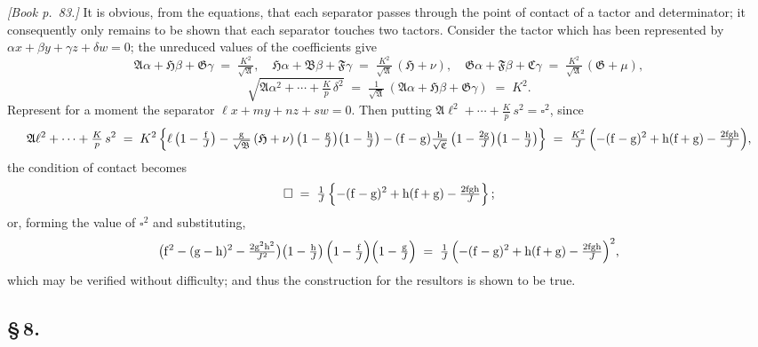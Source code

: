 \documentclass[11pt]{article}
\providecommand{\fA}{\mathfrak{A}}
\providecommand{\fB}{\mathfrak{B}}
\providecommand{\fC}{\mathfrak{C}}
\providecommand{\fF}{\mathfrak{F}}
\providecommand{\fG}{\mathfrak{G}}
\providecommand{\fH}{\mathfrak{H}}
\begin{document}
\noindent\emph{[Book p.~83.]} It is obvious, from the equations, that each separator passes through the point of contact of a tactor and determinator; it consequently only remains to be shown that each separator touches two tactors. Consider the tactor which has been represented by $\alpha x + \beta y + \gamma z + \delta w = 0$; the unreduced values of the coefficients give
\[
\fA\alpha + \fH\beta + \fG\gamma \;=\; \tfrac{K^{2}}{\sqrt{\fA}},\quad \fH\alpha + \fB\beta + \fF\gamma \;=\; \tfrac{K^{2}}{\sqrt{\fA}}\,(\fH + \nu),\quad \fG\alpha + \fF\beta + \fC\gamma \;=\; \tfrac{K^{2}}{\sqrt{\fA}}\,(\fG + \mu),
\]
\[
\sqrt{\fA\alpha^{2} + \cdots + \tfrac{K}{p}\,\delta^{2}} \;=\; \tfrac{1}{\sqrt{\fA}}\,(\fA\alpha + \fH\beta + \fG\gamma) \;=\; K^{2}.
\]
Represent for a moment the separator $\ell x + my + nz + sw = 0$. Then putting $\fA \ell^{2} + \cdots + \tfrac{K}{p}\,s^{2} = \square^{2}$, since
\[
\fA \ell^{2} + \cdots + \tfrac{K}{p}\,s^{2} \;=\; K^{2}\,\Bigl\{\ell\,\bigl(1 - \tfrac{\mathrm{f}}{J}\bigr) - \tfrac{\mathrm{g}}{\sqrt{\fB}}\,(\fH + \nu)\,\bigl(1 - \tfrac{\mathrm{g}}{J}\bigr)\bigl(1 - \tfrac{\mathrm{h}}{J}\bigr) - (\mathrm{f} - \mathrm{g})\tfrac{\mathrm{h}}{\sqrt{\fC}}\,\bigl(1 - \tfrac{2\mathrm{g}}{J}\bigr)\bigl(1 - \tfrac{\mathrm{h}}{J}\bigr)\Bigr\}
\;=\; \tfrac{K^{2}}{J}\,\Bigl(-(\mathrm{f} - \mathrm{g})^{2} + \mathrm{h}(\mathrm{f} + \mathrm{g}) - \tfrac{2\mathrm{f}\mathrm{g}\mathrm{h}}{J}\Bigr),
\]
the condition of contact becomes
\[
\square \;=\; \tfrac{1}{J}\,\Bigl\{-(\mathrm{f} - \mathrm{g})^{2} + \mathrm{h}(\mathrm{f} + \mathrm{g}) - \tfrac{2\mathrm{f}\mathrm{g}\mathrm{h}}{J}\Bigr\}\,;
\]
or, forming the value of $\square^{2}$ and substituting,
\[
\bigl(\mathrm{f}^{2} - (\mathrm{g} - \mathrm{h})^{2} - \tfrac{2\mathrm{g}^{2}\mathrm{h}^{2}}{J^{2}}\bigr)\bigl(1 - \tfrac{\mathrm{h}}{J}\bigr)\,\Bigl(1 - \tfrac{\mathrm{f}}{J}\Bigr)\Bigl(1 - \tfrac{\mathrm{g}}{J}\Bigr) \;=\; \tfrac{1}{J}\,\Bigl(-(\mathrm{f} - \mathrm{g})^{2} + \mathrm{h}(\mathrm{f} + \mathrm{g}) - \tfrac{2\mathrm{f}\mathrm{g}\mathrm{h}}{J}\Bigr)^{2},
\]
which may be verified without difficulty; and thus the construction for the resultors is shown to be true.

\bigskip

\subsection*{\S\,8.}
\end{document}
